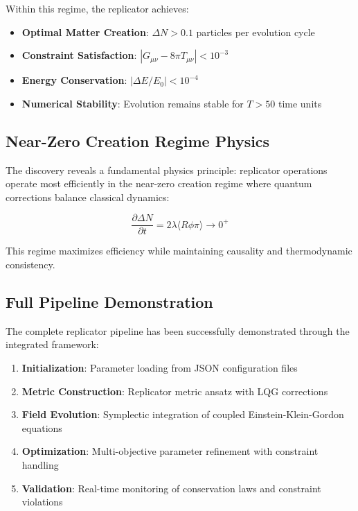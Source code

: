 \documentclass[11pt]{article}
\begin{document}
Within this regime, the replicator achieves:
\begin{itemize}
\item \textbf{Optimal Matter Creation}: $\Delta N > 0.1$ particles per evolution cycle
\item \textbf{Constraint Satisfaction}: $|G_{\mu\nu} - 8\pi T_{\mu\nu}| < 10^{-3}$
\item \textbf{Energy Conservation}: $|\Delta E/E_0| < 10^{-4}$
\item \textbf{Numerical Stability}: Evolution remains stable for $T > 50$ time units
\end{itemize}

\subsection{Near-Zero Creation Regime Physics}

The discovery reveals a fundamental physics principle: replicator operations operate most efficiently in the near-zero creation regime where quantum corrections balance classical dynamics:

\[
\frac{\partial \Delta N}{\partial t} = 2\lambda \langle R \phi \pi \rangle \rightarrow 0^+
\]

This regime maximizes efficiency while maintaining causality and thermodynamic consistency.

\subsection{Full Pipeline Demonstration}

The complete replicator pipeline has been successfully demonstrated through the integrated framework:

\begin{enumerate}
\item \textbf{Initialization}: Parameter loading from JSON configuration files
\item \textbf{Metric Construction}: Replicator metric ansatz with LQG corrections
\item \textbf{Field Evolution}: Symplectic integration of coupled Einstein-Klein-Gordon equations
\item \textbf{Optimization}: Multi-objective parameter refinement with constraint handling
\item \textbf{Validation}: Real-time monitoring of conservation laws and constraint violations
\end{enumerate}
\end{document}
